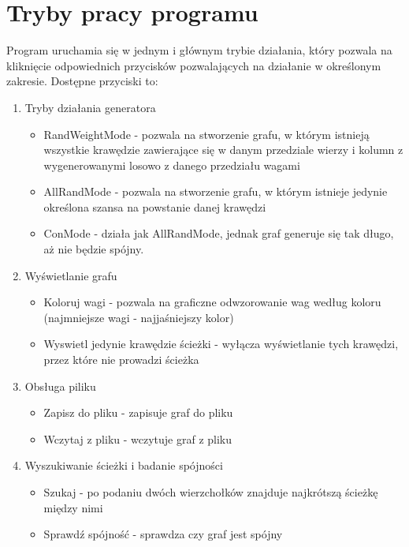 \documentclass{article}
\begin{document}
\section{Tryby pracy programu}
    Program uruchamia się w jednym i głównym trybie działania, który pozwala na kliknięcie odpowiednich przycisków pozwalających na działanie w określonym zakresie. Dostępne przyciski to:
    \begin{enumerate}
    \item Tryby działania generatora
    \begin{itemize}
        \item RandWeightMode - pozwala na stworzenie grafu, w którym istnieją wszystkie krawędzie
        zawierające się w danym przedziale wierzy i kolumn z wygenerowanymi losowo z danego przedziału wagami
        \item AllRandMode - pozwala na stworzenie grafu, w którym istnieje jedynie określona szansa
        na powstanie danej krawędzi
        \item  ConMode - działa jak AllRandMode, jednak graf generuje się tak długo, aż nie będzie spójny.
    \end{itemize}
    \item Wyświetlanie grafu
    \begin{itemize}
        \item Koloruj wagi - pozwala na graficzne odwzorowanie wag według koloru (najmniejsze wagi - najjaśniejszy kolor)
        \item Wyswietl jedynie krawędzie ścieżki - wyłącza wyświetlanie tych krawędzi, przez które nie prowadzi ścieżka
        
    \end{itemize}
    \item Obsługa piliku
    \begin{itemize}
        \item Zapisz do pliku - zapisuje graf do pliku
        \item Wczytaj z pliku - wczytuje graf z pliku
    \end{itemize}
    \item Wyszukiwanie ścieżki i badanie spójności
    \begin{itemize}
        \item Szukaj - po podaniu dwóch wierzchołków znajduje najkrótszą ścieżkę między nimi
        \item Sprawdź spójność - sprawdza czy graf jest spójny
    \end{itemize}
    
\end {enumerate}
\end{document}
